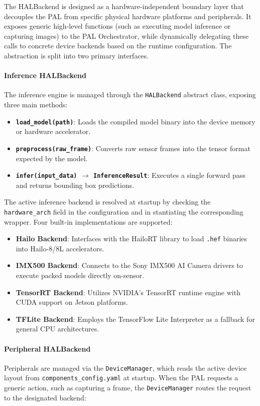 The \gls{HAL}Backend is designed as a hardware-independent boundary layer that decouples the \gls{PAL} from specific physical hardware platforms and peripherals. It exposes generic high-level functions (such as executing model inference or capturing images) to the \gls{PAL} Orchestrator, while dynamically delegating these calls to concrete device backends based on the runtime configuration. The abstraction is split into two primary interfaces.

\paragraph{Inference \gls{HAL}Backend}
The inference engine is managed through the \texttt{HALBackend} abstract class, exposing three main methods:

\begin{itemize}
    \item \textbf{\texttt{load\_model(path)}}: Loads the compiled model binary into the device memory or hardware accelerator.
    \item \textbf{\texttt{preprocess(raw\_frame)}}: Converts raw sensor frames into the tensor format expected by the model.
    \item \textbf{\texttt{infer(input\_data)} $\rightarrow$ \texttt{InferenceResult}}: Executes a single forward pass and returns bounding box predictions.
\end{itemize}

The active inference backend is resolved at startup by checking the \texttt{hardware\_arch} field in the configuration and in
stantiating the corresponding wrapper. Four built-in implementations are supported:
\begin{itemize}
    \item \textbf{Hailo Backend}: Interfaces with the HailoRT library to load \texttt{.hef} binaries into Hailo-8/8L accelerators.
    \item \textbf{IMX500 Backend}: Connects to the Sony IMX500 AI Camera drivers to execute packed models directly on-sensor.
    \item \textbf{TensorRT Backend}: Utilizes NVIDIA's TensorRT runtime engine with CUDA support on Jetson platforms.
    \item \textbf{TFLite Backend}: Employs the TensorFlow Lite Interpreter as a fallback for general CPU architectures.
\end{itemize}

\paragraph{Peripheral \gls{HAL}Backend}
Peripherals are managed via the \texttt{DeviceManager}, which reads the active device layout from \texttt{components\_config.yaml} at startup. When the \gls{PAL} requests a generic action, such as capturing a frame, the \texttt{DeviceManager} routes the request to the designated backend:

